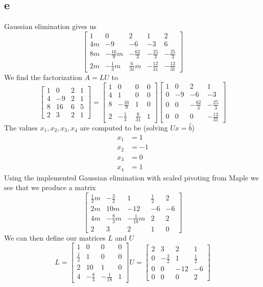 \documentclass[12pt]{article}
\begin{document}
\subsection*{e}
Gaussian elimination gives us
$$
\begin{bmatrix}
1 & 0 & 2 & 1 & 2\\
4m & -9 & -6 & -3 & 6 \\
8m & -\frac{16}{9}m & -\frac{62}{3} & -\frac{25}{3} & -\frac{25}{3}\\
2m & -\frac{1}{3}m & \frac{6}{31}m & -\frac{12}{31} & -\frac{12}{31}
\end{bmatrix}
$$
We find the factorization $A=LU$ to
$$
\begin{bmatrix}
1 & 0 & 2 & 1\\
4 & -9 & 2 & 1 \\
8 & 16 & 6 & 5 \\
2 & 3 & 2 & 1
\end{bmatrix}
=
\begin{bmatrix}
1 & 0 & 0 & 0\\
4 & 1 & 0 & 0 \\
8 & -\frac{16}{9} & 1 & 0 \\
2 & -\frac{1}{3} & \frac{6}{31} & 1
\end{bmatrix}
\begin{bmatrix}
1 & 0 & 2 & 1\\
0 & -9 & -6 & -3 \\
0 & 0 & -\frac{62}{3} & -\frac{25}{3} \\
0 & 0 & 0 & -\frac{12}{31}
\end{bmatrix}
$$
The values $x_1,x_2,x_3,x_4$ are computed to be (solving $Ux=\hat{b}$)
\begin{align*}
x_1&=1 \\
x_2&=-1 \\
x_3&=0 \\
x_4&=1
\end{align*}
Using the implemented Gaussian elimination with scaled pivoting from Maple we see that we produce a matrix
$$
\begin{bmatrix}
\frac{1}{2}m & -\frac{3}{2} & 1 & \frac{1}{2} & 2\\
2m & 10m & -12 & -6 & -6\\
4m & -\frac{8}{3}m & -\frac{1}{18}m & 2 & 2\\
2 & 3 & 2 & 1 & 0
\end{bmatrix}
$$
We can then define our matrices $L$ and $U$
$$
L
=
\begin{bmatrix}
1 & 0 & 0 & 0\\
\frac{1}{2} & 1 & 0 & 0 \\
2 & 10 & 1 & 0 \\
4 & -\frac{8}{3} & -\frac{1}{18} & 1
\end{bmatrix}
U
=
\begin{bmatrix}
2 & 3 & 2 & 1\\
0 & -\frac{3}{2} & 1 & \frac{1}{2} \\
0 & 0 & -12 & -6 \\
0 & 0 & 0 & 2
\end{bmatrix}
$$
\end{document}
